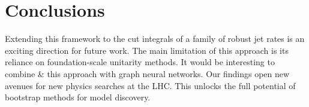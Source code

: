 \section{Conclusions}\label{sec:conclusions}

Extending this framework to the cut integrals of a family of robust jet
rates is an exciting direction for future work. The main limitation of
this approach is its reliance on foundation-scale unitarity methods. It
would be interesting to combine & this approach with graph neural
networks. Our findings open new avenues for new physics searches at the
LHC. This unlocks the full potential of bootstrap methods for model
discovery.

